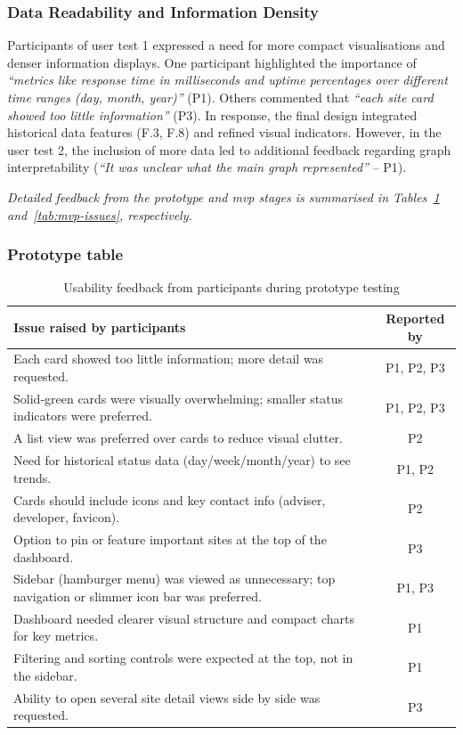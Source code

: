 \subsubsection{Data Readability and Information Density}
Participants of user test 1 expressed a need for more compact visualisations and denser information displays. One participant highlighted the importance of \textit{“metrics like response time in milliseconds and uptime percentages over different time ranges (day, month, year)”} (P1). Others commented that \textit{“each site card showed too little information”} (P3). In response, the final design integrated historical data features (F.3, F.8) and refined visual indicators. However, in the user test 2, the inclusion of more data led to additional feedback regarding graph interpretability (\textit{“It was unclear what the main graph represented”} – P1).

\textit{Detailed feedback from the prototype and \acrshort{mvp} stages is summarised in Tables~\ref{tab:prototype-issues} and~\ref{tab:mvp-issues}, respectively.}


\subsubsection{Prototype table}
\begin{table}[H]
\centering
\begin{tabular}{|p{8.2cm}|c|}
\hline
\textbf{Issue raised by participants} & \textbf{Reported by} \\ \hline
Each card showed too little information; more detail was requested.& P1, P2, P3 \\ \hline
Solid‑green cards were visually overwhelming; smaller status indicators were preferred. & P1, P2, P3 \\ \hline
A list view was preferred over cards to reduce visual clutter. & P2 \\ \hline
Need for historical status data (day/week/month/year) to see trends. & P1, P2 \\ \hline
Cards should include icons and key contact info (adviser, developer, favicon). & P2 \\ \hline
Option to pin or feature important sites at the top of the dashboard. & P3 \\ \hline
Sidebar (hamburger menu) was viewed as unnecessary; top navigation or slimmer icon bar was preferred. & P1, P3 \\ \hline
Dashboard needed clearer visual structure and compact charts for key metrics. & P1 \\ \hline
Filtering and sorting controls were expected at the top, not in the sidebar. & P1 \\ \hline
Ability to open several site detail views side by side was requested. & P3 \\ \hline
\end{tabular}
\caption{Usability feedback from participants during prototype testing}
\label{tab:prototype-issues}
\end{table}

